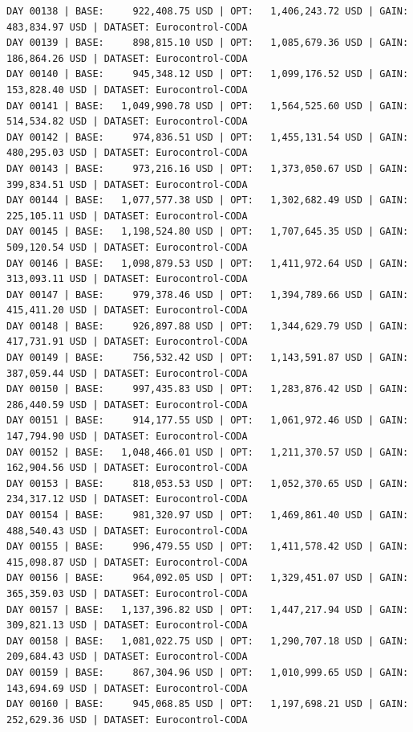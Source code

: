 \documentclass[11pt,a4paper]{article}
\begin{document}
\begin{verbatim}
DAY 00138 | BASE:     922,408.75 USD | OPT:   1,406,243.72 USD | GAIN: 483,834.97 USD | DATASET: Eurocontrol-CODA
DAY 00139 | BASE:     898,815.10 USD | OPT:   1,085,679.36 USD | GAIN: 186,864.26 USD | DATASET: Eurocontrol-CODA
DAY 00140 | BASE:     945,348.12 USD | OPT:   1,099,176.52 USD | GAIN: 153,828.40 USD | DATASET: Eurocontrol-CODA
DAY 00141 | BASE:   1,049,990.78 USD | OPT:   1,564,525.60 USD | GAIN: 514,534.82 USD | DATASET: Eurocontrol-CODA
DAY 00142 | BASE:     974,836.51 USD | OPT:   1,455,131.54 USD | GAIN: 480,295.03 USD | DATASET: Eurocontrol-CODA
DAY 00143 | BASE:     973,216.16 USD | OPT:   1,373,050.67 USD | GAIN: 399,834.51 USD | DATASET: Eurocontrol-CODA
DAY 00144 | BASE:   1,077,577.38 USD | OPT:   1,302,682.49 USD | GAIN: 225,105.11 USD | DATASET: Eurocontrol-CODA
DAY 00145 | BASE:   1,198,524.80 USD | OPT:   1,707,645.35 USD | GAIN: 509,120.54 USD | DATASET: Eurocontrol-CODA
DAY 00146 | BASE:   1,098,879.53 USD | OPT:   1,411,972.64 USD | GAIN: 313,093.11 USD | DATASET: Eurocontrol-CODA
DAY 00147 | BASE:     979,378.46 USD | OPT:   1,394,789.66 USD | GAIN: 415,411.20 USD | DATASET: Eurocontrol-CODA
DAY 00148 | BASE:     926,897.88 USD | OPT:   1,344,629.79 USD | GAIN: 417,731.91 USD | DATASET: Eurocontrol-CODA
DAY 00149 | BASE:     756,532.42 USD | OPT:   1,143,591.87 USD | GAIN: 387,059.44 USD | DATASET: Eurocontrol-CODA
DAY 00150 | BASE:     997,435.83 USD | OPT:   1,283,876.42 USD | GAIN: 286,440.59 USD | DATASET: Eurocontrol-CODA
DAY 00151 | BASE:     914,177.55 USD | OPT:   1,061,972.46 USD | GAIN: 147,794.90 USD | DATASET: Eurocontrol-CODA
DAY 00152 | BASE:   1,048,466.01 USD | OPT:   1,211,370.57 USD | GAIN: 162,904.56 USD | DATASET: Eurocontrol-CODA
DAY 00153 | BASE:     818,053.53 USD | OPT:   1,052,370.65 USD | GAIN: 234,317.12 USD | DATASET: Eurocontrol-CODA
DAY 00154 | BASE:     981,320.97 USD | OPT:   1,469,861.40 USD | GAIN: 488,540.43 USD | DATASET: Eurocontrol-CODA
DAY 00155 | BASE:     996,479.55 USD | OPT:   1,411,578.42 USD | GAIN: 415,098.87 USD | DATASET: Eurocontrol-CODA
DAY 00156 | BASE:     964,092.05 USD | OPT:   1,329,451.07 USD | GAIN: 365,359.03 USD | DATASET: Eurocontrol-CODA
DAY 00157 | BASE:   1,137,396.82 USD | OPT:   1,447,217.94 USD | GAIN: 309,821.13 USD | DATASET: Eurocontrol-CODA
DAY 00158 | BASE:   1,081,022.75 USD | OPT:   1,290,707.18 USD | GAIN: 209,684.43 USD | DATASET: Eurocontrol-CODA
DAY 00159 | BASE:     867,304.96 USD | OPT:   1,010,999.65 USD | GAIN: 143,694.69 USD | DATASET: Eurocontrol-CODA
DAY 00160 | BASE:     945,068.85 USD | OPT:   1,197,698.21 USD | GAIN: 252,629.36 USD | DATASET: Eurocontrol-CODA

\end{verbatim}
\end{document}
